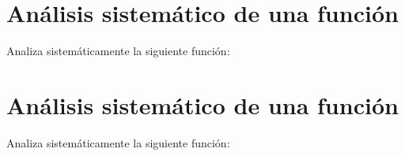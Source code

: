 \documentclass[nochap,palatino]{apuntes}
\newcommand{\newexample}[1]{
	\section{Análisis sistemático de una función}
	Analiza sistemáticamente la siguiente función:
	
	
	\newpage
}
\begin{document}
\newexample{tex/function}
\newexample{tex/function2}
\end{document}
